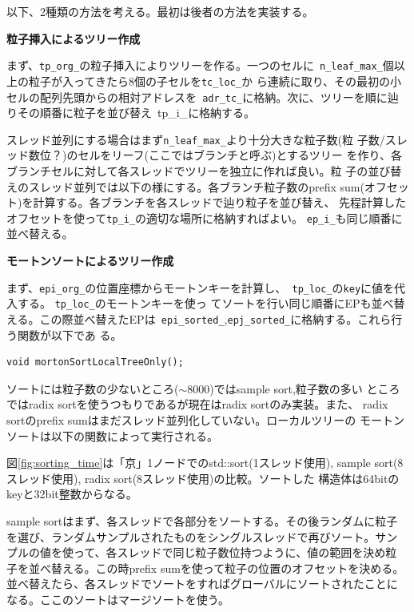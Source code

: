 
以下、2種類の方法を考える。最初は後者の方法を実装する。

{\bf 粒子挿入によるツリー作成}

まず、{\tt tp\_org\_}の粒子挿入によりツリーを作る。一つのセルに{\tt
n\_leaf\_max\_}個以上の粒子が入ってきたら8個の子セルを{\tt tc\_loc\_}か
ら連続に取り、その最初の小セルの配列先頭からの相対アドレスを{\tt
adr\_tc\_}に格納。次に、ツリーを順に辿りその順番に粒子を並び替え{\
tp\_i\_}に格納する。

スレッド並列にする場合はまず{\tt n\_leaf\_max\_}より十分大きな粒子数(粒
子数/スレッド数位？)のセルをリーフ(ここではブランチと呼ぶ)とするツリー
を作り、各ブランチセルに対して各スレッドでツリーを独立に作れば良い。粒
子の並び替えのスレッド並列では以下の様にする。各ブランチ粒子数のprefix
sum(オフセット)を計算する。各ブランチを各スレッドで辿り粒子を並び替え、
先程計算したオフセットを使って{\tt tp\_i\_}の適切な場所に格納すればよい。
{\tt ep\_i\_}も同じ順番に並べ替える。

{\bf モートンソートによるツリー作成}

まず、{\tt epi\_org\_}の位置座標からモートンキーを計算し、{\tt
tp\_loc\_}の{\tt key}に値を代入する。 {\tt tp\_loc\_}のモートンキーを使っ
てソートを行い同じ順番にEPも並べ替える。この際並べ替えたEPは{\tt
epi\_sorted\_},{\tt epj\_sorted\_}に格納する。これら行う関数が以下であ
る。

\begin{screen}
\begin{verbatim}
void mortonSortLocalTreeOnly();
\end{verbatim}
\end{screen}

ソートには粒子数の少ないところ($\sim 8000$)ではsample sort,粒子数の多い
ところではradix sortを使うつもりであるが現在はradix sortのみ実装。また、
radix sortのprefix sumはまだスレッド並列化していない。ローカルツリーの
モートンソートは以下の関数によって実行される。

図\ref{fig:sorting_time}は「京」1ノードでのstd::sort(1スレッド使用),
sample sort(8スレッド使用), radix sort(8スレッド使用)の比較。ソートした
構造体は64bitのkeyと32bit整数からなる。

sample sortはまず、各スレッドで各部分をソートする。その後ランダムに粒子
を選び、ランダムサンプルされたものをシングルスレッドで再びソート。サン
プルの値を使って、各スレッドで同じ粒子数位持つように、値の範囲を決め粒
子を並べ替える。この時prefix sumを使って粒子の位置のオフセットを決める。
並べ替えたら、各スレッドでソートをすればグローバルにソートされたことに
なる。ここのソートはマージソートを使う。

